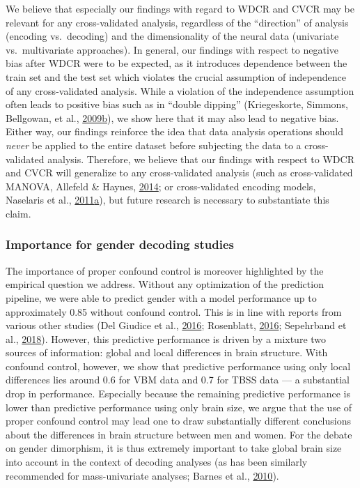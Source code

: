 \documentclass[11pt,american,]{memoir} %
\begin{document}
We believe that especially our findings with regard to WDCR and CVCR may be relevant for any cross-validated analysis, regardless of the ``direction'' of analysis (encoding vs.~decoding) and the dimensionality of the neural data (univariate vs.~multivariate approaches). In general, our findings with respect to negative bias after WDCR were to be expected, as it introduces dependence between the train set and the test set which violates the crucial assumption of independence of any cross-validated analysis. While a violation of the independence assumption often leads to positive bias such as in ``double dipping'' (Kriegeskorte, Simmons, Bellgowan, et al., \protect\hyperlink{ref-Kriegeskorte2009-yz}{2009}\protect\hyperlink{ref-Kriegeskorte2009-yz}{b}), we show here that it may also lead to negative bias. Either way, our findings reinforce the idea that data analysis operations should \emph{never} be applied to the entire dataset before subjecting the data to a cross-validated analysis. Therefore, we believe that our findings with respect to WDCR and CVCR will generalize to any cross-validated analysis (such as cross-validated MANOVA, Allefeld \& Haynes, \protect\hyperlink{ref-allefeld2014searchlight}{2014}; or cross-validated encoding models, Naselaris et al., \protect\hyperlink{ref-naselaris2011encoding}{2011}\protect\hyperlink{ref-naselaris2011encoding}{a}), but future research is necessary to substantiate this claim.

\hypertarget{importance-for-gender-decoding-studies}{%
\subsubsection{Importance for gender decoding studies}\label{importance-for-gender-decoding-studies}}

The importance of proper confound control is moreover highlighted by the empirical question we address. Without any optimization of the prediction pipeline, we were able to predict gender with a model performance up to approximately 0.85 without confound control. This is in line with reports from various other studies (Del Giudice et al., \protect\hyperlink{ref-Del_Giudice2016-ns}{2016}; Rosenblatt, \protect\hyperlink{ref-Rosenblatt2016-oy}{2016}; Sepehrband et al., \protect\hyperlink{ref-Sepehrband2018-dy}{2018}). However, this predictive performance is driven by a mixture two sources of information: global and local differences in brain structure. With confound control, however, we show that predictive performance using only local differences lies around 0.6 for VBM data and 0.7 for TBSS data --- a substantial drop in performance. Especially because the remaining predictive performance is lower than predictive performance using only brain size, we argue that the use of proper confound control may lead one to draw substantially different conclusions about the differences in brain structure between men and women. For the debate on gender dimorphism, it is thus extremely important to take global brain size into account in the context of decoding analyses (as has been similarly recommended for mass-univariate analyses; Barnes et al., \protect\hyperlink{ref-Barnes2010-pu}{2010}).
\end{document}

